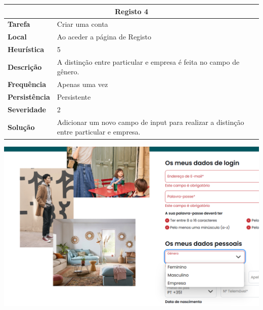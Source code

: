 \documentclass[a4paper,12pt]{article}
\begin{document}
\begin{center}
\newpage
    \begin{table}[h!]
        \centering
        \begin{tabular}{|m{3cm}|m{12cm}|}
        \hline
        \multicolumn{2}{|c|}{\textbf{Registo 4}} \\ \hline
        \textbf{Tarefa}       & Criar uma conta\\ \hline
        \textbf{Local}        & Ao aceder a página de Registo \\ \hline
        \textbf{Heurística}   & 5  \\ \hline
        \textbf{Descrição}    & A distinção entre particular e empresa é feita no campo de gênero. \\ \hline
        \textbf{Frequência}   & Apenas uma vez \\ \hline
        \textbf{Persistência} & Persistente \\ \hline
        \textbf{Severidade}   & 2 \\ \hline
        \textbf{Solução}      & Adicionar um novo campo de input para realizar a distinção entre particular e empresa. \\ \hline
        \end{tabular}
    \end{table}
    
    \vspace{0.5cm}
    \includegraphics[width=\textwidth, keepaspectratio]{heuristics/04genero_registo.png}


\end{center}
\end{document}
